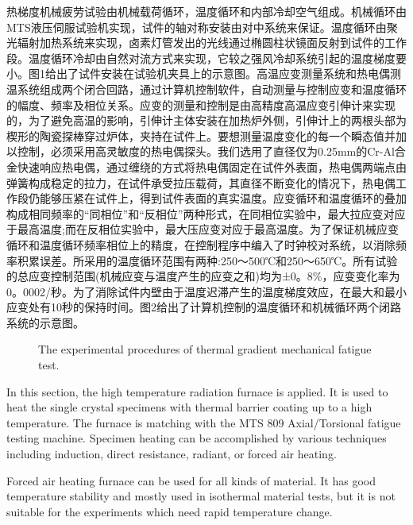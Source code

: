热梯度机械疲劳试验由机械载荷循环，温度循环和内部冷却空气组成。机械循环由MTS液压伺服试验机实现，试件的轴对称安装由对中系统来保证。温度循环由聚光辐射加热系统来实现，卤素灯管发出的光线通过椭圆柱状镜面反射到试件的工作段。温度循环冷却由自然对流方式来实现，它较之强风冷却系统引起的温度梯度要小。图1给出了试件安装在试验机夹具上的示意图。高温应变测量系统和热电偶测温系统组成两个闭合回路，通过计算机控制软件，自动测量与控制应变和温度循环的幅度、频率及相位关系。应变的测量和控制是由高精度高温应变引伸计来实现的，为了避免高温的影响，引伸计主体安装在加热炉外侧，引伸计上的两根头部为楔形的陶瓷探棒穿过炉体，夹持在试件上。要想测量温度变化的每一个瞬态值并加以控制，必须采用高灵敏度的热电偶探头。我们选用了直径仅为0.25mm的Cr-Al合金快速响应热电偶，通过缠绕的方式将热电偶固定在试件外表面，热电偶两端点由弹簧构成稳定的拉力，在试件承受拉压载荷，其直径不断变化的情况下，热电偶工作段仍能够压紧在试件上，得到试件表面的真实温度。应变循环和温度循环的叠加构成相同频率的“同相位”和“反相位”两种形式，在同相位实验中，最大拉应变对应于最高温度;而在反相位实验中，最大压应变对应于最高温度。为了保证机械应变循环和温度循环频率相位上的精度，在控制程序中编入了时钟校对系统，以消除频率积累误差。所采用的温度循环范围有两种:250～500℃和250～650℃。所有试验的总应变控制范围(机械应变与温度产生的应变之和)均为±0。8\%，应变变化率为0。0002/秒。为了消除试件内壁由于温度迟滞产生的温度梯度效应，在最大和最小应变处有10秒的保持时间。图2给出了计算机控制的温度循环和机械循环两个闭路系统的示意图。

\begin{figure}[!htp]
\caption{The experimental procedures of thermal gradient mechanical fatigue test.}
\label{Fig:procedure}
\end{figure}

In this section, the high temperature radiation furnace is applied.
It is used to heat the single crystal specimens with thermal barrier coating up to a high temperature.
The furnace is matching with the MTS 809 Axial/Torsional fatigue testing machine.
Specimen heating can be accomplished by various techniques including induction, direct resistance, radiant, or forced air heating.




Forced air heating furnace can be used for all kinds of material. It has good temperature stability and mostly used in isothermal material tests, but it is not suitable for the experiments which need rapid temperature change.

